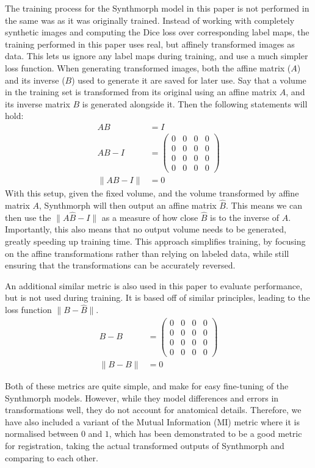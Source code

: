 The training process for the Synthmorph model in this paper is not performed in the same was as it was originally trained. Instead of working with completely synthetic images and computing the Dice loss over corresponding label maps, the training performed in this paper uses real, but affinely transformed images as data. This lets us ignore any label maps during training, and use a much simpler loss function. When generating transformed images, both the affine matrix ($A$) and its inverse ($B$) used to generate it are saved for later use. Say that a volume in the training set is transformed from its original using an affine matrix $A$, and its inverse matrix $B$ is generated alongside it. Then the following statements will hold:
\begin{align*}
  AB &= I\\
  AB - I &=
  \begin{pmatrix}
    0&0&0&0\\
    0&0&0&0\\
    0&0&0&0\\
    0&0&0&0
  \end{pmatrix}\\
  \|AB - I\| &= 0
\end{align*}
With this setup, given the fixed volume, and the volume transformed by affine matrix $A$, Synthmorph will then output an affine matrix $\hat{B}$. This means we can then use the $\|A\hat{B} - I\|$ as a measure of how close $\hat{B}$ is to the inverse of $A$. Importantly, this also means that no output volume needs to be generated, greatly speeding up training time. This approach simplifies training, by focusing on the affine transformations rather than relying on labeled data, while still ensuring that the transformations can be accurately reversed.

An additional similar metric is also used in this paper to evaluate performance, but is not used during training. It is based off of similar principles, leading to the loss function $\|B-\hat{B}\|$.
\begin{align*}
  B-B &=
  \begin{pmatrix}
    0&0&0&0\\
    0&0&0&0\\
    0&0&0&0\\
    0&0&0&0
  \end{pmatrix}\\
  \|B-B\| &= 0
\end{align*}

Both of these metrics are quite simple, and make for easy fine-tuning of the Synthmorph models. However, while they model differences and errors in transformations well, they do not account for anatomical details. Therefore, we have also included a variant of the Mutual Information (MI) metric where it is normalised between $0$ and $1$, which has been demonstrated to be a good metric for registration\cite{mi}, taking the actual transformed outputs of Synthmorph and comparing to each other.

